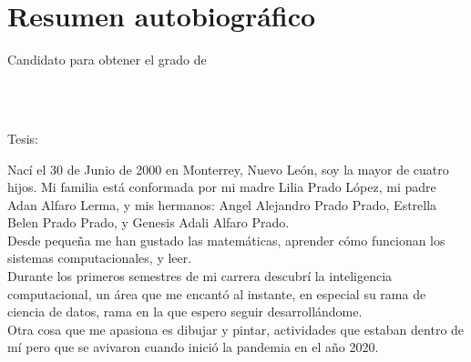 
\chapter*{Resumen autobiográfico}
\thispagestyle{empty}

\begin{center}
\autor

Candidato para obtener el grado de\\
\grado\\
\orientacion\bigskip

\uanl\\
\fime\bigskip

Tesis:\\
\textsc{\large\titulo}
\end{center}\bigskip

Nací el 30 de Junio de 2000 en Monterrey, Nuevo León, soy la mayor de cuatro hijos. Mi familia está conformada por mi madre Lilia Prado López, mi padre Adan Alfaro Lerma, y mis hermanos: Angel Alejandro Prado Prado, Estrella Belen Prado Prado, y Genesis Adali Alfaro Prado. \\
Desde pequeña me han gustado las matemáticas, aprender cómo funcionan los sistemas computacionales, y leer. \\
Durante los primeros semestres de mi carrera descubrí la inteligencia computacional, un área que me encantó al instante, en especial su rama de ciencia de datos, rama en la que espero seguir desarrollándome. \\
Otra cosa que me apasiona es dibujar y pintar, actividades que estaban dentro de mí pero que se avivaron cuando inició la pandemia en el año 2020.